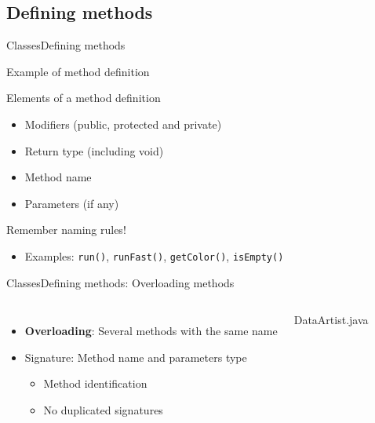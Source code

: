 \documentclass[10pt,compress]{beamer} %
\begin{document}
\subsection{Defining methods}
\begin{frame}{Classes}{Defining methods}
		\vspace{-0.2cm}
		\begin{block}{Example of method definition}
		\vspace{-0.2cm}
			
		\end{block}

	Elements of a method definition
	\begin{itemize}
		\item Modifiers (public, protected and private)
		\item Return type (including void)
		\item Method name
		\item Parameters (if any)
	\end{itemize}
	Remember naming rules!
	\begin{itemize}
		\item Examples: \texttt{run()}, \texttt{runFast()}, \texttt{getColor()}, \texttt{isEmpty()}
	\end{itemize}
\end{frame}

\begin{frame}{Classes}{Defining methods: Overloading methods}
    \begin{columns}
			\begin{itemize}
			\item \textbf{Overloading}: Several methods with the same name
			\item Signature: Method name and parameters type
			\begin{itemize}
			\item Method identification
			\item No duplicated signatures
			\end{itemize}
			\end{itemize}

		\vspace{-0.3cm}
		\begin{block}{DataArtist.java}
		\vspace{-0.3cm}
			
		\end{block}
	\end{columns}
\end{frame}
\end{document}
